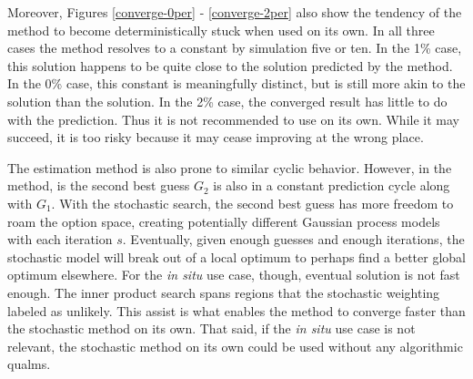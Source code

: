 Moreover,
Figures \ref{converge-0per} - \ref{converge-2per} also show the tendency of
the \innerprod method to become deterministically stuck when used on its own.
In all three cases the \innerprod method resolves to a constant by
simulation five or ten.  In the 1\% case, this solution happens to be quite close
to the solution predicted by the \allflag method.  In the 0\% case, this
constant is meaningfully distinct, but is still more akin to the \stochastic
solution than the \allflag solution.  In the 2\% case, the converged \innerprod
result has little to do with the \allflag prediction.  Thus it is not
recommended to use \innerprod on its own. While it may succeed, it is too
risky because it may cease improving at the wrong place.

The \stochastic estimation method is also prone to similar cyclic behavior.
However, in the \innerprod method,
is the second best guess $G_2$ is also in a constant prediction cycle along
with $G_1$.  With the stochastic search, the second best
guess has more freedom to roam the option space, creating potentially
different Gaussian process models with each iteration $s$.  Eventually, given
enough guesses and enough iterations, the stochastic model will break
out of a local optimum to perhaps find a better global optimum elsewhere.
For the \emph{in situ} use case, though, eventual solution is not fast
enough.  The inner product search spans regions that the stochastic weighting
labeled as unlikely.  This assist is what enables the \allflag method
to converge faster than the stochastic method on its own.  That said,
if the \emph{in situ} use case is not relevant, the stochastic method on
its own could be used without any algorithmic qualms.

